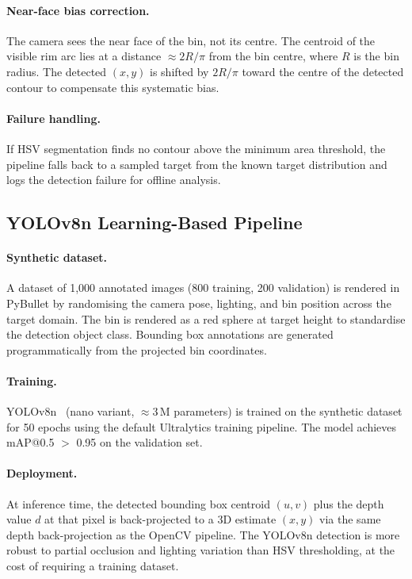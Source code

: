 \paragraph{Near-face bias correction.}
The camera sees the near face of the bin, not its centre.
The centroid of the visible rim arc lies at a distance $\approx 2R/\pi$ from the
bin centre, where $R$ is the bin radius.
The detected $(x, y)$ is shifted by $2R/\pi$ toward the centre of the detected
contour to compensate this systematic bias.

\paragraph{Failure handling.}
If HSV segmentation finds no contour above the minimum area threshold, the pipeline
falls back to a sampled target from the known target distribution and logs the detection
failure for offline analysis.

\subsection{YOLOv8n Learning-Based Pipeline}
\label{sec:study5:yolo}

\paragraph{Synthetic dataset.}
A dataset of 1{,}000 annotated images (800 training, 200 validation) is rendered in
PyBullet by randomising the camera pose, lighting, and bin position across the target
domain.
The bin is rendered as a red sphere at target height to standardise the detection
object class.
Bounding box annotations are generated programmatically from the projected bin
coordinates.

\paragraph{Training.}
YOLOv8n~\cite{yolov8} (nano variant, $\approx 3$\,M parameters) is trained on the synthetic dataset
for 50 epochs using the default Ultralytics training pipeline.
The model achieves mAP@0.5 $>$ 0.95 on the validation set.

\paragraph{Deployment.}
At inference time, the detected bounding box centroid $(u, v)$ plus the depth value $d$
at that pixel is back-projected to a 3D estimate $(x, y)$ via the same depth
back-projection as the OpenCV pipeline.
The YOLOv8n detection is more robust to partial occlusion and lighting variation than
HSV thresholding, at the cost of requiring a training dataset.

